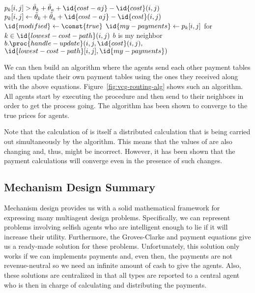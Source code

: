\begin{SCfigure}
\begin{minipage}{1.0\linewidth}
\begin{codebox}
      \li     \Do \If $p_k[i,j] > \tilde{\theta}_k + \tilde{\theta}_a
      + \id{cost-aj} - \id{cost}(i,j)$
      \li         \Then $p_k[i,j] \gets \tilde{\theta}_k + \tilde{\theta}_a
      + \id{cost-aj} - \id{cost}(i,j)$
      \li               $\id{modified} \gets \const{true}$
                  \End
              \End
          \End
      \li \If {} 
      \li \Then $\id{my-payments} \gets p_k[i,j]$ for $k \in
      \id{lowest-cost-path}(i,j)$ 
      \li       \For $b$ is my neighbor
      \li       \Do $b.\proc{handle-update}(i,j,\id{cost}(i,j),$
      \zi \>\>\>$\id{lowest-cost-path}[i,j], \id{my-payments})$
                \End
          \End
    \end{codebox}
    \caption{Algorithm for calculating  payments for the
      inter-domain routing problem. $i$ refers to the agent running the
      algorithm. All agents start by executing  and
      then send a  to all their neighbors.}
    \label{fig:vcg-routing-alg}
  \end{minipage}
\end{SCfigure}
We can then build an algorithm where the agents send each other
payment tables and then update their own payment tables using the ones
they received along with the above equations.
Figure~\ref{fig:vcg-routing-alg} shows such an algorithm. All agents
start by executing the procedure  and then send
 to their neighbors in order to get the process
going. The algorithm has been shown to converge to the true prices for
agents.

Note that the calculation of  is itself a
distributed calculation that is being carried out simultaneously by
the  algorithm.  This means that the values of
 are also changing and, thus, might be incorrect.
However, it has been shown that the payment calculations will converge
even in the presence of such changes.


\subsection{Mechanism Design Summary}

Mechanism design provides us with a solid mathematical framework for
expressing many multiagent design problems. Specifically, we can
represent problems involving selfish agents who are intelligent enough
to lie if it will increase their utility. Furthermore, the
Groves-Clarke and  payment equations give us a ready-made solution
for these problems. Unfortunately, this solution only works if we can
implements payments and, even then, the payments are not
revenue-neutral so we need an infinite amount of cash to give the
agents. Also, these solutions are centralized in that all types are
reported to a central agent who is then in charge of calculating and
distributing the payments.

